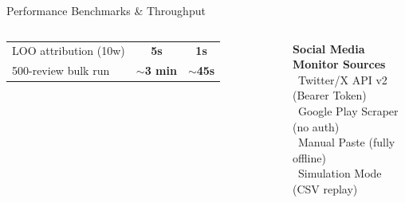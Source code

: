 \documentclass[aspectratio=169]{beamer}
\begin{document}
\begin{frame}{Performance Benchmarks \& Throughput}
\begin{columns}[T]
\begin{tabular}{>{\scriptsize}p{3.0cm} >{\scriptsize\bfseries}c >{\scriptsize\bfseries}c}
        LOO attribution (10w) & 5s          & 1s \\
        500-review bulk run   & $\sim$3 min & $\sim$45s \\
        \bottomrule
      \end{tabular}
      \vspace{0.3cm}
      \begin{tcolorbox}[colback=navyblue!8, colframe=navyblue, arc=4pt]
        \small\textbf{\color{navyblue}Social Media Monitor Sources}\\[3pt]
        \scriptsize
        \faSatelliteDish\ Twitter/X API v2 (Bearer Token)\\
        \faPlay\ Google Play Scraper (no auth)\\
        \faPaste\ Manual Paste (fully offline)\\
        \faPlay\ Simulation Mode (CSV replay)
      \end{tcolorbox}
  \end{columns}
\end{frame}
\end{document}
